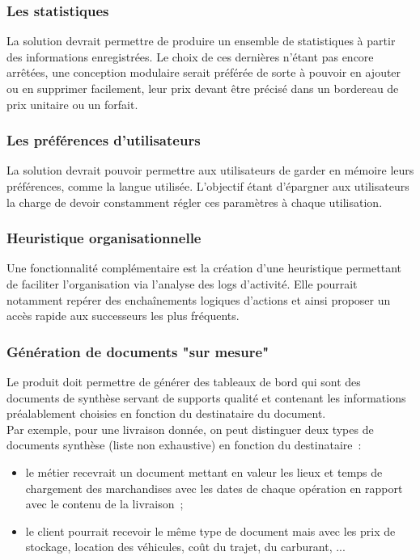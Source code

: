 \subsubsection{Les statistiques}
La solution devrait permettre de produire un ensemble de statistiques à partir des informations enregistrées. Le choix de ces dernières n'étant pas encore arrêtées, une conception modulaire serait préférée de sorte à pouvoir en ajouter ou en supprimer facilement, leur prix devant être précisé dans un bordereau de prix unitaire ou un forfait.

\subsubsection{Les préférences d'utilisateurs}
La solution devrait pouvoir permettre aux utilisateurs de garder en mémoire leurs préférences, comme la langue utilisée. L'objectif étant d'épargner aux utilisateurs la charge de devoir constamment régler ces paramètres à chaque utilisation.

\subsubsection{Heuristique organisationnelle}
Une fonctionnalité complémentaire est la création d'une heuristique permettant de faciliter l'organisation via l'analyse des logs d'activité. Elle pourrait notamment repérer des enchaînements logiques d'actions et ainsi proposer un accès rapide aux successeurs les plus fréquents.

\subsubsection{Génération de documents "sur mesure"}
Le produit doit permettre de générer des \og{}tableaux de bord\fg{} qui sont des documents de synthèse servant de supports qualité et contenant les informations préalablement choisies en fonction du destinataire du document.
\\
Par exemple, pour une livraison donnée, on peut distinguer deux types de documents synthèse (liste non exhaustive) en fonction du destinataire~:
\begin{itemize}
\item le métier recevrait un document mettant en valeur les lieux et temps de chargement des marchandises avec les dates de chaque opération en rapport avec le contenu de la livraison~;
\item le client pourrait recevoir le même type de document mais avec les prix de stockage, location des véhicules, coût du trajet, du carburant, ...
\end{itemize}

